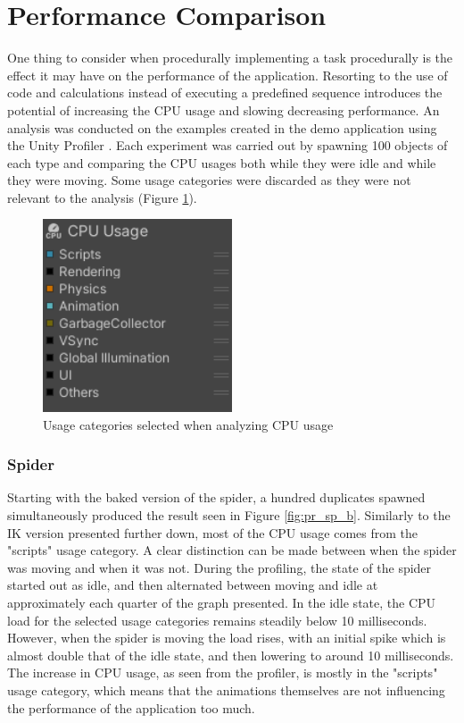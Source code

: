 \section{Performance Comparison}
One thing to consider when procedurally implementing a task procedurally is the
effect it may have on the performance of the application. Resorting to the use
of code and calculations instead of executing a predefined sequence introduces
the potential of increasing the CPU usage and slowing decreasing performance. An
analysis was conducted on the examples created in the demo application using the
Unity Profiler \cite{unity_profiler}. Each experiment was carried out by
spawning 100 objects of each type and comparing the CPU usages both while they
were idle and while they were moving. Some usage categories were discarded as
they were not relevant to the analysis (Figure \ref{fig:profiler_settings}).

\begin{figure}[h!]
    \centering
    \captionsetup{justification=centering}
    \includegraphics[width=0.5\textwidth]{grafika/profiler_settings.png}
    \caption{Usage categories selected when analyzing CPU usage}
    \label{fig:profiler_settings}
\end{figure}

\subsubsection{Spider}
Starting with the baked version of the spider, a hundred duplicates spawned
simultaneously produced the result seen in Figure \ref{fig:pr_sp_b}. Similarly
to the IK version presented further down, most of the CPU usage comes from the
"scripts" usage category. A clear distinction can be made between when the
spider was moving and when it was not. During the profiling, the state of the
spider started out as idle, and then alternated between moving and idle at
approximately each quarter of the graph presented. In the idle state, the CPU
load for the selected usage categories remains steadily below 10 milliseconds.
However, when the spider is moving the load rises, with an initial spike which
is almost double that of the idle state, and then lowering to around 10
milliseconds. The increase in CPU usage, as seen from the profiler, is mostly in
the "scripts" usage category, which means that the animations themselves are not
influencing the performance of the application too much.

